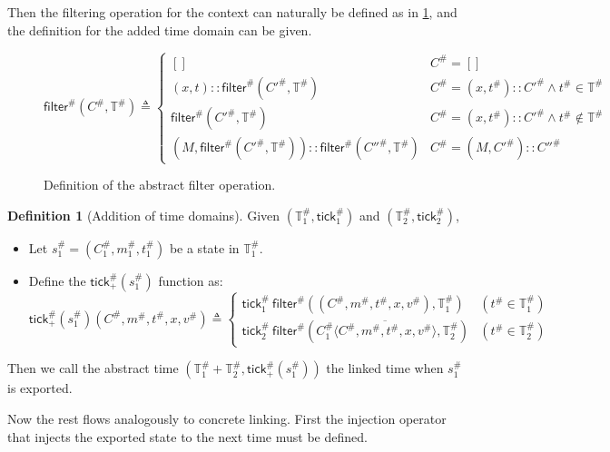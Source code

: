 \documentclass[acmsmall,review]{acmart}\settopmatter{printfolios=true,printccs=false,printacmref=false}
\theoremstyle{definition}
\newtheorem{definition}{Definition}[section]
\newcommand*{\cons}{::}
\newcommand*{\A}[1]{{#1}^{\#}}
\newcommand*{\Time}{\mathbb{T}}
\newcommand*{\ATime}{\A{\Time}}
\newcommand*{\mem}{m}
\newcommand*{\tick}{\mathsf{tick}}
\newcommand*{\delete}[2]{{#1}\overline{\langle{#2}\rangle}}
\newcommand*{\filter}{\mathsf{filter}}
\begin{document}
Then the filtering operation for the context can naturally be defined as in \ref{fig:absfilter}, and the definition for the added time domain can be given.
\begin{figure}[h!]
  \footnotesize
  \[
    \A\filter(\A{C},\ATime)\triangleq
    \begin{cases}
      []                                                         & \A{C}=[]                                             \\
      (x,t)\cons\A\filter(\A{C'},\ATime)                         & \A{C}=(x,\A{t})\cons \A{C'}\wedge \A{t}\in\ATime     \\
      \A\filter(\A{C'},\ATime)                                   & \A{C}=(x,\A{t})\cons \A{C'}\wedge \A{t}\not\in\ATime \\
      (M,\A\filter(\A{C'},\ATime))\cons\A\filter(\A{C''},\ATime) & \A{C}=(M, \A{C'})\cons \A{C''}
    \end{cases}
  \]
  \caption{Definition of the abstract filter operation.}
  \label{fig:absfilter}
\end{figure}

\begin{definition}[Addition of time domains]
  Given $(\ATime_1,\A\tick_1)$ and $(\ATime_2,\A\tick_2)$,

  \begin{itemize}
    \item Let $\A{s}_1=(\A{C}_1,\A{\mem}_1,\A{t}_1)$ be a state in $\ATime_1$.
    \item Define the $\A{\tick}_+(\A{s}_1)$ function as:
          \[
            \A\tick_{+}(\A{s}_1)(\A{C},\A\mem,\A{t},x,\A{v})\triangleq
            \begin{cases}
              \A{\tick}_1\:\A\filter((\A{C},\A\mem,\A{t},x,\A{v}),\ATime_1)                 & (\A{t}\in\ATime_1) \\
              \A{\tick}_2\:\A\filter(\delete{\A{C}_1}{\A{C},\A\mem,\A{t},x,\A{v}},\ATime_2) & (\A{t}\in\ATime_2)
            \end{cases}
          \]
  \end{itemize}

  Then we call the abstract time $(\ATime_1+\ATime_2,\A\tick_{+}(\A{s}_1))$ the linked time when $\A{s}_1$ is exported.
\end{definition}

Now the rest flows analogously to concrete linking.
First the injection operator that injects the exported state to the next time must be defined.
\end{document}
